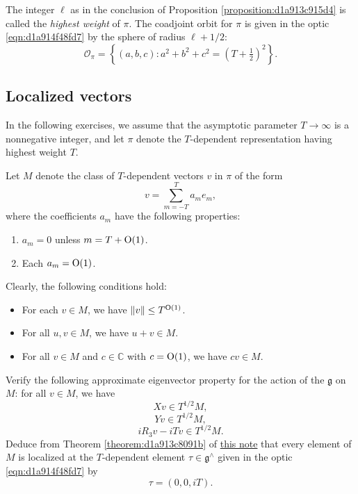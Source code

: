 \documentclass[reqno]{amsart} 
\numberwithin{equation}{section}
\numberwithin{theorem}{section}
\begin{document}
The integer $\ell$ as in the conclusion of Proposition \ref{proposition:d1a913c915d4} is called the \emph{highest weight} of $\pi$.  The coadjoint orbit for $\pi$ is given in the optic \eqref{eqn:d1a914f48fd7} by the sphere of radius $\ell + 1/2$:
\begin{equation*}
\mathcal{O}_\pi = \left\{ (a,b,c) : a^2 + b^2 + c^2 = (T + \tfrac{1}{2} )^2 \right\}.
\end{equation*}

\subsection{Localized vectors}\label{sec:d1a9162ebd8a}

In the following exercises, we assume that the asymptotic parameter $T \rightarrow \infty$ is a nonnegative integer, and let $\pi$ denote the $T$-dependent representation having highest weight $T$.

\begin{exercise}\label{exercise:d1a913e1e9ec}
  Let $M$ denote the class of $T$-dependent vectors $v$ in $\pi$ of the form
  \begin{equation}\label{eqn:d1a913e68561}
    v = \sum_{m=-T}^T a_m e_m,
  \end{equation}
  where the coefficients $a_m$ have the following properties:
  \begin{enumerate}
  \item $a_m = 0$ unless $m = T + \operatorname{O}(1)$.
  \item Each $a_m = \operatorname{O}(1)$.
  \end{enumerate}
  Clearly, the following conditions hold:
  \begin{itemize}
  \item For each $v \in M$, we have $\lVert v \rVert \leq T^{\operatorname{O}(1)}$.
  \item For all $u, v \in M$, we have $u + v \in M$.
  \item For all $v \in M$ and $c \in \mathbb{C}$ with $c = \operatorname{O}(1)$, we have $c v \in M$.
  \end{itemize}
  Verify the following approximate eigenvector property for the action of the $\mathfrak{g}$ on $M$: for all $v \in M$, we have
  \begin{equation*}
    X v \in T^{1/2} M,
  \end{equation*}
  \begin{equation*}
    Y v \in T^{1/2} M,
  \end{equation*}
  \begin{equation*}
    i R_3 v - i T v \in T^{1/2} M.
  \end{equation*}
  Deduce from Theorem \ref{theorem:d1a913c8091b} of \href{20230522T150333__microlocal-localized-vectors.pdf}{this note} that every element of $M$ is localized at the $T$-dependent element $\tau \in \mathfrak{g}^\wedge$ given in the optic \eqref{eqn:d1a914f48fd7} by
  \begin{equation*}
\tau = (0,0,i T).
\end{equation*}
\end{exercise}
\end{document}
